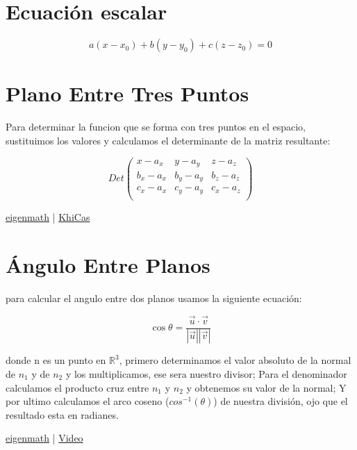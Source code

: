 \documentclass[11pt]{article}
\begin{document}
\section{Ecuación escalar}
\label{sec:org7c32d6d}
\begin{DEMONSTRATION}
\[
a (x-x_0) + b (y - y_0) + c (z - z_0) = 0
\]
\end{DEMONSTRATION}

\section{Plano Entre Tres Puntos}
\label{sec:org92f5ef7}
Para determinar la funcion que se forma con tres puntos en el espacio, sustituimos los valores y calculamos el determinante de la matriz resultante:

\begin{DEMONSTRATION}
\[ Det \begin{pmatrix}
   x-a_x   & y-a_y   & z-a_z   \\
   b_x-a_x & b_y-a_y & b_z-a_z \\
   c_x-a_x & c_y-a_y & c_x-a_z \\
\end{pmatrix} \]
\end{DEMONSTRATION}

\href{https://github.com/Galindo-lab/calculator/blob/main/eigenmath/plano-entre-3-puntos}{eigenmath} | \href{https://github.com/Galindo-lab/calculator/blob/main/xcas/plano.cas}{KhiCas} 

\section{Ángulo Entre Planos}
\label{sec:orgeda36ae}
para calcular el angulo entre dos planos usamos la siguiente ecuación:

\begin{DEMONSTRATION}
\[
\cos \theta = \frac{\vec{u} \cdot \vec{v}}{\left|\vec{u}\right|\left|\vec{v}\right|}
\]
\end{DEMONSTRATION}

donde n es un punto en \(\mathbb{R}^3\), primero determinamos el valor absoluto de la normal de \(n_1\) y de \(n_2\) y los multiplicamos, ese sera nuestro divisor; Para el denominador calculamos el producto cruz entre \(n_1\) y \(n_2\) y obtenemos su valor de la normal; Y por ultimo calculamos el arco coseno (\(cos^{-1}(\theta)\)) de nuestra división, ojo que el resultado esta en radianes.

\href{https://github.com/Galindo-lab/calculator/blob/main/eigenmath/angulo-entre-dos-planos}{eigenmath} | \href{https://youtu.be/qEVrSjLyOdU}{Video}
\end{document}
